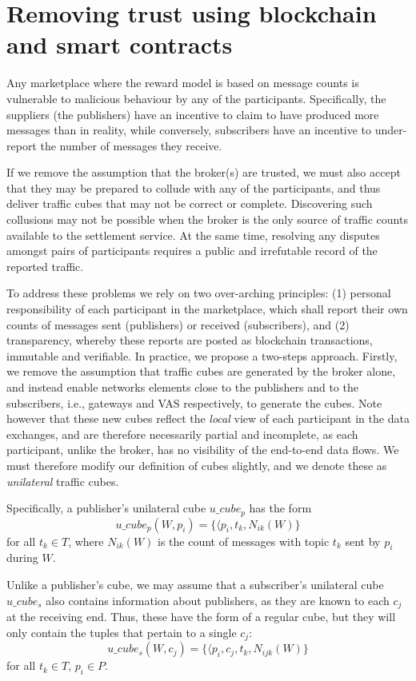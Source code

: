 \documentclass[conference]{IEEEtran}
\begin{document}
\section{Removing trust using blockchain and smart contracts}

Any marketplace where the reward model is based on message counts is vulnerable to malicious behaviour by any of the participants. Specifically, the suppliers (the publishers) have an incentive to claim to have produced more messages than in reality, while conversely, subscribers have an incentive to under-report the number of messages they receive.

If we remove the assumption that the broker(s) are trusted, we must also accept that they may be prepared to collude with any of the participants, and thus deliver traffic cubes that may not be correct or complete.
Discovering such collusions may not be possible when the broker is the only source of traffic counts available to the settlement service.  At the same time, resolving any disputes amongst pairs of participants requires a public and irrefutable record of the reported traffic.

To address these problems we rely on two over-arching principles: (1) personal responsibility of each participant in the marketplace, which shall report their own counts of messages sent (publishers) or received (subscribers), and (2) transparency, whereby these reports are posted as blockchain transactions, immutable and verifiable.
In practice, we propose a two-steps approach.
%
Firstly, we remove the assumption that traffic cubes are generated by the broker alone, and instead enable networks elements close to the publishers and to the subscribers, i.e., gateways and VAS respectively, to generate the cubes.
Note however that these new cubes reflect the \textit{local} view of each participant in the data exchanges, and are therefore necessarily partial and incomplete, as each participant, unlike the broker, has no visibility of the end-to-end data flows. 
We must therefore modify our definition of cubes slightly, and we denote these as \textit{unilateral} traffic cubes.

Specifically, a publisher's unilateral cube $\mathit{u\_cube_p}$ has the form
\[
\mathit{u\_cube_p}(W, p_i)  =  \{ \langle p_i, t_k, N_{ik}(W)\}
\]
for all $t_k \in T$, where $N_{ik}(W)$ is the count of messages with topic $t_k$ sent by $p_i$ during $W$.

Unlike a publisher's cube, we may assume that a subscriber's unilateral cube $\mathit{u\_cube_s}$ also contains information about publishers, as they are known to each $c_j$ at the receiving end.
Thus, these have the form of a regular cube, but they will only contain the tuples that pertain to a single $c_j$:
\[
\mathit{u\_cube_s}(W, c_j)  =  \{ \langle p_i, c_j, t_k, N_{ijk}(W)\}
\]
for all $t_k \in T$, $p_i \in P$.
\end{document}
